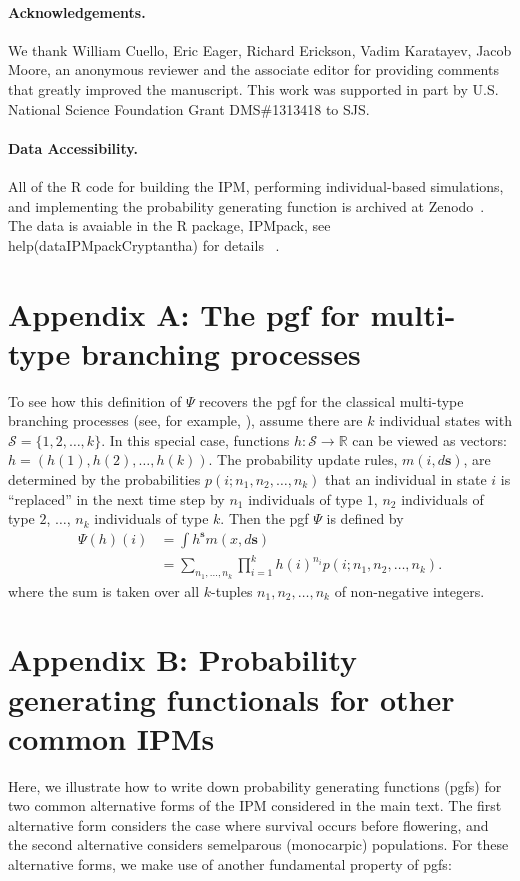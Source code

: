 \documentclass[12pt]{amsart}\usepackage[]{graphicx}\usepackage[]{color}
\def\R{\mathbb R}
\def\S{\mathcal S}
\def\s{\mathbf s}
\begin{document}
\vskip 0.1in
\paragraph{\bf Acknowledgements.} We thank William Cuello, Eric Eager, Richard Erickson, Vadim Karatayev, Jacob Moore, an anonymous reviewer and the associate editor for providing comments that greatly improved the manuscript. This work was supported in part by U.S. National Science Foundation Grant DMS\#1313418 to SJS. 
\vskip 0.1in 
\paragraph{\bf Data Accessibility.} 
All of the R code for building the IPM, performing individual-based simulations, and implementing the probability generating function is archived at Zenodo~\citep{schreiber-ross-ibipm-code-2015}. The data is avaiable in the R package, IPMpack,  see help(dataIPMpackCryptantha) for details ~\citep{IPMpack}.


\newpage
\section*{Appendix A: The pgf for multi-type branching processes}
To see how this definition of $\Psi$ recovers the pgf for the classical multi-type branching processes (see, for example, \citet{caswell-01}),  assume there are $k$ individual states with $\S=\{1,2,\dots,k\}$. In this special case, functions $h:\S\to \R$ can be viewed as vectors: $h=(h(1),h(2),\dots,h(k))$. The probability update rules, $m(i,d\s)$, are determined by the probabilities $p(i;n_1,n_2,\dots,n_k)$ that an individual in state $i$ is ``replaced'' in the next time step by  $n_1$ individuals of type $1$, $n_2$ individuals of type $2$, $\dots$, $n_k$ individuals of type $k$. Then the pgf $\Psi$ is defined by
\[
\begin{aligned}
\Psi(h)(i)&=\int h^\s m(x,d\s)\\
&= \sum_{n_1,\dots,n_k} \prod_{i=1}^k h(i)^{n_i} p(i;n_1,n_2,\dots,n_k).
\end{aligned}
\]
where the sum is taken over all $k$-tuples $n_1,n_2,\dots,n_k$ of non-negative integers.
\newpage

\section*{Appendix B: Probability generating functionals for other common IPMs}
Here, we illustrate how to write down probability generating functions (pgfs) for two common alternative forms of the IPM considered in the main text. The first alternative form considers the case where survival occurs before flowering, and the second alternative considers semelparous (monocarpic) populations. For these alternative forms, we make use of another fundamental property of pgfs:
\vskip 0.1in
\vskip 0.1in
\end{document}
